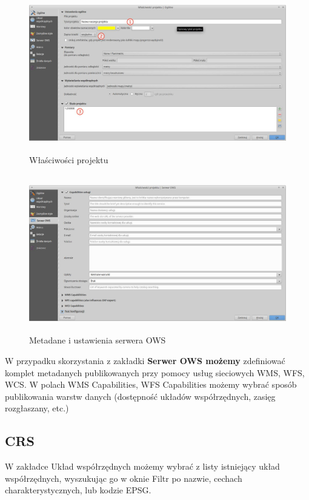 \documentclass[12pt,a4paper]{book}
\begin{document}
\begin{center}
\begin{figure}
\includegraphics[width=13cm,height=6.858cm]{002-projekt.png}
\caption{Właściwości projektu}
\end{figure}
\end{center}


\begin{center}
\begin{figure}
\includegraphics[width=13cm,height=6.862cm]{002-projekt-ows.jpg}
\caption{Metadane i ustawienia serwera OWS}
\end{figure}
\end{center}
W przypadku skorzystania z zakładki \textbf{Serwer OWS możemy }zdefiniować komplet metadanych publikowanych przy pomocy usług sieciowych WMS, WFS, WCS. W polach WMS Capabilities, WFS Capabilities możemy wybrać sposób publikowania warstw danych (dostępność układów współrzędnych, zasięg rozgłaszany, etc.)

\subsection{CRS}
W zakładce Układ współrzędnych możemy wybrać z listy istniejący układ współrzędnych, wyszukując go w oknie Filtr po nazwie, cechach charakterystycznych, lub kodzie EPSG.
\end{document}
